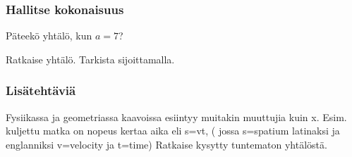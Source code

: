 \begin{tehtavasivu}
\subsubsection*{Hallitse kokonaisuus}

\begin{tehtava}
Päteekö yhtälö, kun $a=7$?
	\begin{alakohdat}
	\end{alakohdat}
    \begin{vastaus}
	\begin{alakohdat}
		\alakohta{Pätee.}
		\alakohta{Ei päde.}
	\end{alakohdat}
    \end{vastaus}
\end{tehtava}


\begin{tehtava}
Ratkaise yhtälö. Tarkista sijoittamalla.
\begin{alakohdat}
\end{alakohdat}
%
\begin{vastaus}
\begin{alakohdat}
\end{alakohdat}
%
\end{vastaus}
\end{tehtava}

\subsubsection*{Lisätehtäviä}

\begin{tehtava}
Fysiikassa ja geometriassa kaavoissa esiintyy muitakin muuttujia kuin x.
Esim. kuljettu matka on nopeus kertaa aika eli s=vt, ( jossa
s=spatium latinaksi ja englanniksi v=velocity ja t=time)
Ratkaise kysytty tuntematon yhtälöstä.


\end{tehtava}
\end{tehtavasivu}
